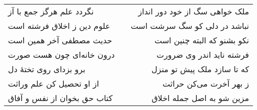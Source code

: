 \begin{center}
\begin{longtable}{l p{0.5cm} r}
نگردد علم هرگز جمع با آز
&&
ملک خواهی سگ از خود دور انداز
\\
علوم دین ز اخلاق فرشته است
&&
نباشد در دلی کو سگ سرشت است
\\
حدیث مصطفی آخر همین است
&&
نکو بشنو که البته چنین است
\\
درون خانه‌ای چون هست صورت
&&
فرشته ناید اندر وی ضرورت
\\
برو بزدای روی تختهٔ دل
&&
که تا سازد ملک پیش تو منزل
\\
از او تحصیل کن علم وراثت
&&
ز بهر آخرت می‌کن حراثت
\\
کتاب حق بخوان از نفس و آفاق
&&
مزین شو به اصل جمله اخلاق
\\
\end{longtable}
\end{center}
